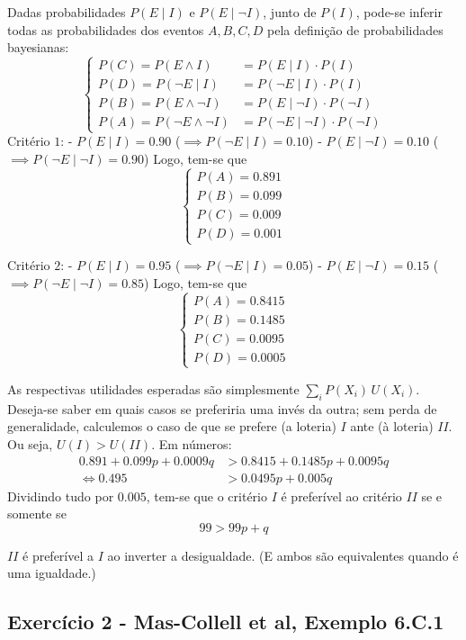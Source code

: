 \documentclass[12pt]{article}
\numberwithin{equation}{section}
\theoremstyle{plain}
\theoremstyle{definition}
\theoremstyle{remark}
\begin{document}
Dadas probabilidades \(P(E \mid I)\) e \(P(E \mid \lnot I)\), junto de \(P(I)\), pode-se inferir todas as probabilidades dos eventos \(A, B, C, D\) pela definição de probabilidades bayesianas:
\[
\begin{cases}
P(C) = P(E \land I) &= P(E \mid I) \cdot P(I) \\
P(D) = P(\lnot E \mid I) &= P(\lnot E \mid I) \cdot P(I) \\
P(B) = P(E \land \lnot I) &= P(E \mid \lnot I) \cdot P(\lnot I) \\
P(A) = P(\lnot E \land \lnot I) &= P(\lnot E \mid \lnot I) \cdot P(\lnot I)
\end{cases}
\]
Critério \(1\): - \(P(E \mid I) = 0.90\) (\(\implies P(\lnot E \mid I) = 0.10\)) - \(P(E \mid \lnot I) = 0.10\) (\(\implies P(\lnot E \mid \lnot I) = 0.90\)) Logo, tem-se que
\[
\begin{cases}
P(A) = 0.891 \\
P(B) = 0.099 \\
P(C) = 0.009 \\
P(D) = 0.001
\end{cases}
\]

Critério \(2\): - \(P(E \mid I) = 0.95\) (\(\implies P(\lnot E \mid I) = 0.05\)) - \(P(E \mid \lnot I) = 0.15\) (\(\implies P(\lnot E \mid \lnot I) = 0.85\)) Logo, tem-se que
\[
\begin{cases}
P(A) = 0.8415 \\
P(B) = 0.1485 \\
P(C) = 0.0095 \\
P(D) = 0.0005
\end{cases}
\]

As respectivas utilidades esperadas são simplesmente \(\sum \limits_{i} P(X_{i}) \, U(X_{i})\). Deseja-se saber em quais casos se preferiria uma invés da outra; sem perda de generalidade, calculemos o caso de que se prefere (a loteria) \(I\) ante (à loteria) \(II\). Ou seja, \(U(I) > U(II)\). Em números:
\[
\begin{align}
0.891 + 0.099 p + 0.0009 q &> 0.8415 + 0.1485p + 0.0095 q \\
\iff 0.495 &> 0.0495p + 0.005q
\end{align}
\]
Dividindo tudo por \(0.005\), tem-se que o critério \(I\) é preferível ao critério \(II\) se e somente se
\[
99 > 99p + q
\]

\(II\) é preferível a \(I\) ao inverter a desigualdade. (E ambos são equivalentes quando é uma igualdade.)

\hypertarget{exercuxedcio-2---mas-collell-et-al-exemplo-6.c.1}{%
\subsection{Exercício 2 - Mas-Collell et al, Exemplo 6.C.1}\label{exercuxedcio-2---mas-collell-et-al-exemplo-6.c.1}}
\end{document}
